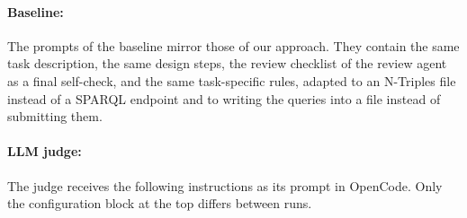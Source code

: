 \paragraph{Baseline:}
The prompts of the baseline mirror those of our approach. They contain the same task description, the same design steps, the review checklist of the review agent as a final self-check, and the same task-specific rules, adapted to an N-Triples file instead of a SPARQL endpoint and to writing the queries into a file instead of submitting them.

\paragraph{LLM judge:}
The judge receives the following instructions as its prompt in OpenCode. Only the configuration block at the top differs between runs.

